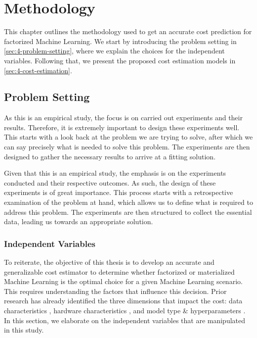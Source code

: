 
\chapter{Methodology}

\label{chapter:methodology}

This chapter outlines the methodology used to get an accurate cost prediction for factorized Machine Learning. We start by introducing the problem setting in \autoref{sec:4-problem-setting}, where we explain the choices for the independent variables. Following that, we present the proposed cost estimation models in \autoref{sec:4-cost-estimation}.

\section{Problem Setting}
\label{sec:4-problem-setting}

As this is an empirical study, the focus is on carried out experiments and their results. Therefore, it is extremely important to design these experiments well. This starts with a look back at the problem we are trying to solve, after which we can say precisely what is needed to solve this problem. The experiments are then designed to gather the necessary results to arrive at a fitting solution.

Given that this is an empirical study, the emphasis is on the experiments conducted and their respective outcomes. As such, the design of these experiments is of great importance. This process starts with a retrospective examination of the problem at hand, which allows us to define what is required to address this problem. The experiments are then structured to collect the essential data, leading us towards an appropriate solution.

\subsection{Independent Variables}
To reiterate, the objective of this thesis is to develop an accurate and generalizable cost estimator to determine whether factorized or materialized Machine Learning is the optimal choice for a given Machine Learning scenario. This requires understanding the factors that influence this decision. Prior research has already identified the three dimensions that impact the cost: data characteristics \cite{morpheus, amalur,schijndel_cost_estimation}, hardware characteristics \cite{orion_learning_gen_lin_models}, and model type \& hyperparameters \cite{amalur,schijndel_cost_estimation}. In this section, we elaborate on the independent variables that are manipulated in this study.

